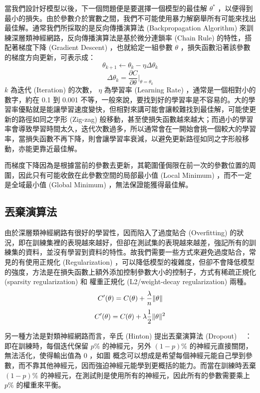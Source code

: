當我們設計好模型以後，下一個問題便是要選擇一個模型的最佳解 $\theta^{\ast}$ ，以便得到最小的損失。由於參數介於實數之間，我們不可能使用暴力解窮舉所有可能來找出最佳解。通常我們所採取的是反向傳播演算法 (Backpropagation Algorithm) 來訓練深層類神經網路，反向傳播演算法是基於微分連鎖率 (Chain Rule) 的特性，搭配著梯度下降 (Gradient Descent) ，也就給定一組參數 $\theta$ ，損失函數沿著該參數的梯度方向更新，可表示成：
\begin{equation}
    \theta_{k+1} \leftarrow \theta_k - \eta\Delta\theta_k
\end{equation}
\begin{equation}
    \Delta\theta_k = \frac{\partial C}{\partial\theta}\biggr|_{\theta = \theta_k}
\end{equation}
$k$ 為迭代 (Iteration) 的次數， $\eta$ 為學習率 (Learning Rate) ，通常是一個相對小的數字，約在 0.1 到 0.001 不等，一般來說，要找到好的學習率是不容易的。大的學習率優點就是能讓學習速度變快，但相對來講可能會讓較難找到最佳解，可能使更新的路徑如同之字形 (Zig-zag) 般移動，甚至使損失函數越來越大；而過小的學習率會導致學習時間太久，迭代次數過多，所以通常會在一開始會挑一個較大的學習率，當損失函數不再下降，則會讓學習率衰減，以避免更新路徑如同之字形般移動，亦能更靠近最佳解。

而梯度下降因為是根據當前的參數去更新，其範圍僅侷限在前一次的參數位置的周圍，因此只有可能收斂在此參數空間的局部最小值 (Local Minimum) ，而不一定是全域最小值 (Global Minimum) ，無法保證能獲得最佳解。

\subsection{丟棄演算法}
由於深層類神經網路有很好的學習性，因而陷入了過度貼合 (Overfitting) 的狀況，即在訓練集裡的表現越來越好，但卻在測試集的表現越來越差，強記所有的訓練集的資料，並沒有學習到資料的特性。故我們需要一些方式來避免過度貼合，常見的有使用正規化 (Regularization) ，可以降低模型的複雜度，但卻不會降低模型的強度，方法是在損失函數上額外添加控制參數大小的控制子，方式有稀疏正規化 (sparsity regularization) 和 權重正規化 (L2/weight-decay regularization) 兩種。
\begin{equation}
    C'(\theta) = C(\theta) + \frac{\lambda}{n}\Arrowvert\theta\Arrowvert
\end{equation}
\begin{equation}
C'(\theta) = C(\theta) + \lambda\frac{1}{2}\Arrowvert\theta\Arrowvert^2
\end{equation}

另一種方法是對類神經網路而言，辛氏 (Hinton) 提出丟棄演算法 (Dropout) ~\cite{srivastava2014dropout} ：即在訓練時，每個迭代保留 $p\%$ 的神經元，另外 $(1-p)\%$ 的神經元直接關閉，無法活化，使得輸出值為 0 ，如圖 %
概念可以想成是希望每個神經元能自己學到參數，而不靠其他神經元，因而強迫神經元能學到更概括的能力。而當在訓練時丟棄 $(1-p)\%$ 的神經元，在測試則是使用所有的神經元，因此所有的參數需要乘上 $p\%$ 的權重來平衡。

